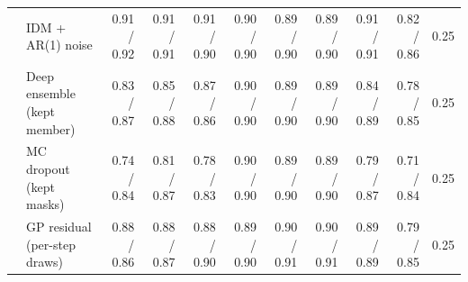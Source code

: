 \begin{longtable}{llrrrrrrrrr}
 & IDM + AR(1) noise & 0.91 / 0.92 & 0.91 / 0.91 & 0.91 / 0.90 & 0.90 / 0.90 & 0.89 / 0.90 & 0.89 / 0.90 & 0.91 / 0.91 & 0.82 / 0.86 & 0.25 \\
 & Deep ensemble (kept member) & 0.83 / 0.87 & 0.85 / 0.88 & 0.87 / 0.86 & 0.90 / 0.90 & 0.89 / 0.90 & 0.89 / 0.90 & 0.84 / 0.89 & 0.78 / 0.85 & 0.25 \\
 & MC dropout (kept masks) & 0.74 / 0.84 & 0.81 / 0.87 & 0.78 / 0.83 & 0.90 / 0.90 & 0.89 / 0.90 & 0.89 / 0.90 & 0.79 / 0.87 & 0.71 / 0.84 & 0.25 \\
 & GP residual (per-step draws) & 0.88 / 0.86 & 0.88 / 0.87 & 0.88 / 0.90 & 0.89 / 0.90 & 0.90 / 0.91 & 0.90 / 0.91 & 0.89 / 0.89 & 0.79 / 0.85 & 0.25 \\
\end{longtable}
\endgroup
